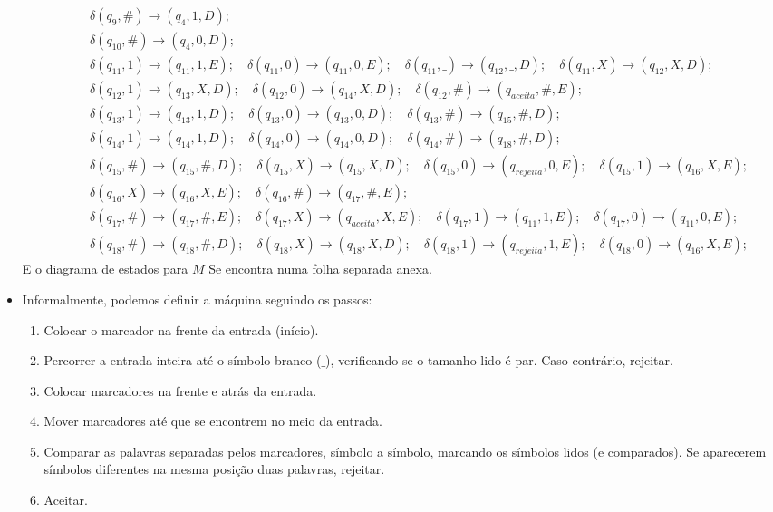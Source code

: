 \documentclass{homework}
\begin{document}
\begin{itemize}
\begin{align*}
			&\qquad \delta(q_9,\#) \rightarrow (q_4,1,D);\\
			&\qquad \delta(q_{10},\#) \rightarrow (q_4,0,D);\\
			&\qquad \delta(q_{11},1) \rightarrow (q_{11},1,E);
			\quad \delta(q_{11},0) \rightarrow (q_{11},0,E);
			\quad \delta(q_{11},\_) \rightarrow (q_{12},\_,D);
			\quad \delta(q_{11},X) \rightarrow (q_{12},X,D);\\
			&\qquad \delta(q_{12},1) \rightarrow (q_{13},X,D);
			\quad \delta(q_{12},0) \rightarrow (q_{14},X,D);
			\quad \delta(q_{12},\#) \rightarrow (q_{aceita},\#,E);\\
			&\qquad \delta(q_{13},1) \rightarrow (q_{13},1,D);
			\quad \delta(q_{13},0) \rightarrow (q_{13},0,D);
			\quad \delta(q_{13},\#) \rightarrow (q_{15},\#,D);\\
			&\qquad \delta(q_{14},1) \rightarrow (q_{14},1,D);
			\quad \delta(q_{14},0) \rightarrow (q_{14},0,D);
			\quad \delta(q_{14},\#) \rightarrow (q_{18},\#,D);\\
			&\qquad \delta(q_{15},\#) \rightarrow (q_{15},\#,D);
			\quad \delta(q_{15},X) \rightarrow (q_{15},X,D);
			\quad \delta(q_{15},0) \rightarrow (q_{rejeita},0,E);
			\quad \delta(q_{15},1) \rightarrow (q_{16},X,E);\\
			&\qquad \delta(q_{16},X) \rightarrow (q_{16},X,E);
			\quad \delta(q_{16},\#) \rightarrow (q_{17},\#,E);\\
			&\qquad \delta(q_{17},\#) \rightarrow (q_{17},\#,E);
			\quad \delta(q_{17},X) \rightarrow (q_{aceita},X,E);
			\quad \delta(q_{17},1) \rightarrow (q_{11},1,E);
			\quad \delta(q_{17},0) \rightarrow (q_{11},0,E);\\
			&\qquad \delta(q_{18},\#) \rightarrow (q_{18},\#,D);
			\quad \delta(q_{18},X) \rightarrow (q_{18},X,D);
			\quad \delta(q_{18},1) \rightarrow (q_{rejeita},1,E);
			\quad \delta(q_{18},0) \rightarrow (q_{16},X,E);
		\end{align*}
		E o diagrama de estados para $M$ Se encontra numa folha separada anexa.
		
		\item Informalmente, podemos definir a máquina seguindo os passos:
			\begin{enumerate}
    				\item Colocar o marcador na frente da entrada (início).
    				\item Percorrer a entrada inteira até o símbolo branco ($\_$), verificando se o tamanho lido é par. Caso contrário, rejeitar.
    				\item Colocar marcadores na frente e atrás da entrada.
    				\item Mover marcadores até que se encontrem no meio da entrada.
    				\item Comparar as palavras separadas pelos marcadores, símbolo a símbolo, marcando os símbolos lidos (e comparados). Se aparecerem símbolos diferentes na mesma posição duas palavras, rejeitar.
    				\item Aceitar.				
			\end{enumerate}
	\end{itemize}
	
\end{document}
